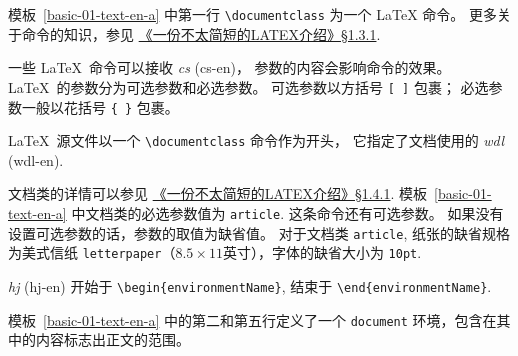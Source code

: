 \documentclass[
    11pt,
    base=hide,
    cite=authoryear,
    device=phone,
    lang=cn,
    mode=simple,
    result=answer,
    toc=onecol,
]{elegantsierxue310}
\begin{document}
模板~\ref{basic-01-text-en-a} 中第一行 \lstinline{\documentclass} 为一个
{\LaTeX} 命令。
\noindent 更多关于命令的知识，参见
\hyperlink{books/lshort-zh-cn.pdf.16}%
{《一份不太简短的LATEX介绍》\S1.3.1}.

\begin{latex}\label{tex:arguments}
    一些 \LaTeX\ 命令可以接收 \emph{\gls{cs}} (\gls{cs-en})，
    参数的内容会影响命令的效果。
    \LaTeX\ 的参数分为可选参数和必选参数。
    可选参数以方括号 \texttt{[~]} 包裹；
    必选参数一般以花括号 \texttt{\{~\}} 包裹。
\end{latex}

\begin{latex}\label{tex:documentclass}
    \LaTeX\ 源文件以一个 \lstinline{\documentclass} 命令作为开头，
    它指定了文档使用的 \emph{\gls{wdl}} (\gls{wdl-en}).
\end{latex}

文档类的详情可以参见 \hyperlink{books/lshort-zh-cn.pdf.17}%
{《一份不太简短的LATEX介绍》\S1.4.1}.
模板~\ref{basic-01-text-en-a} 中文档类的必选参数值为 \lstinline{article}.
这条命令还有可选参数。
如果没有设置可选参数的话，参数的取值为缺省值。
对于文档类 \texttt{article}, 纸张的缺省规格为美式信纸
\texttt{letterpaper}（\(8.5\times11\)英寸），字体的缺省大小为 \texttt{10pt}.

\begin{latex}\label{tex:environment}
    \emph{\gls{hj}} (\gls{hj-en}) 开始于
    \lstinline|\begin{environmentName}|,
    结束于 \lstinline|\end{environmentName}|.
\end{latex}
模板~\ref{basic-01-text-en-a} 中的第二和第五行定义了一个 \texttt{document}
环境，包含在其中的内容标志出正文的范围。
\end{document}
